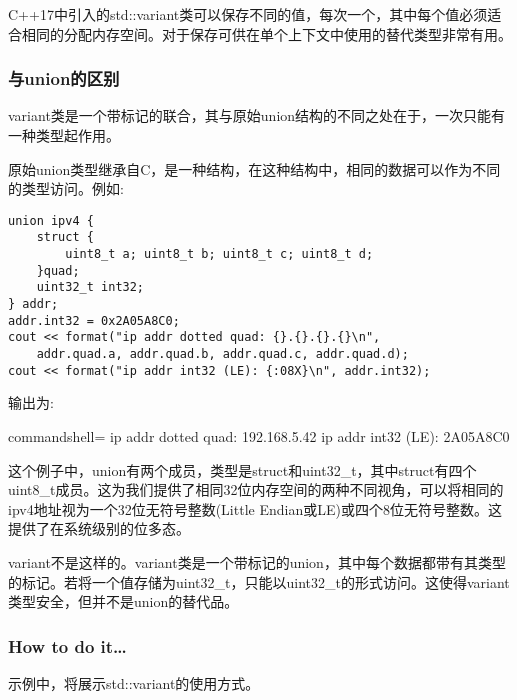 
C++17中引入的std::variant类可以保存不同的值，每次一个，其中每个值必须适合相同的分配内存空间。对于保存可供在单个上下文中使用的替代类型非常有用。

\subsubsection{与union的区别}

variant类是一个带标记的联合，其与原始union结构的不同之处在于，一次只能有一种类型起作用。

原始union类型继承自C，是一种结构，在这种结构中，相同的数据可以作为不同的类型访问。例如:

\begin{lstlisting}[style=styleCXX]
union ipv4 {
	struct {
		uint8_t a; uint8_t b; uint8_t c; uint8_t d;
	}quad;
	uint32_t int32;
} addr;
addr.int32 = 0x2A05A8C0;
cout << format("ip addr dotted quad: {}.{}.{}.{}\n",
	addr.quad.a, addr.quad.b, addr.quad.c, addr.quad.d);
cout << format("ip addr int32 (LE): {:08X}\n", addr.int32);
\end{lstlisting}

输出为:

\begin{tcblisting}{commandshell={}}
ip addr dotted quad: 192.168.5.42
ip addr int32 (LE): 2A05A8C0
\end{tcblisting}

这个例子中，union有两个成员，类型是struct和uint32\_t，其中struct有四个uint8\_t成员。这为我们提供了相同32位内存空间的两种不同视角，可以将相同的ipv4地址视为一个32位无符号整数(Little Endian或LE)或四个8位无符号整数。这提供了在系统级别的位多态。

variant不是这样的。variant类是一个带标记的union，其中每个数据都带有其类型的标记。若将一个值存储为uint32\_t，只能以uint32\_t的形式访问。这使得variant类型安全，但并不是union的替代品。

\subsubsection{How to do it…}

示例中，将展示std::variant的使用方式。

